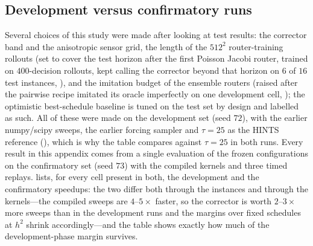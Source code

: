 \begin{table}[H]
\color{red}
\centering
\caption{Measured single-thread cost of one operation as a function of the grid size (Poisson; median of repeated calls). Multigrid uses a direct solve below $64^2$ and is not listed there.}
\resizebox{0.9\textwidth}{!}{\caoverheads}
\label{tab:ca_overheads}
\end{table}

\begin{table}[H]
\color{red}
\centering
\caption{Training-cost amortisation for the GS pairing: corrector training (data generation and least-squares fit, CPU), router training (oracle rollouts and DAgger rounds), median wall-clock saved per solve at $\varepsilon = h^2$ relative to HINTS ($\tau{=}15$) and to the solver alone, and the number of solves after which the router's training cost is recovered relative to HINTS.}
\resizebox{\textwidth}{!}{\caamort}
\label{tab:ca_amort}
\end{table}

\subsection{Development versus confirmatory runs} \label{sec:wallclock_heldout}

Several choices of this study were made after looking at test results: the corrector band and the anisotropic sensor grid, the length of the $512^2$ router-training rollouts (set to cover the test horizon after the first Poisson Jacobi router, trained on $400$-decision rollouts, kept calling the corrector beyond that horizon on $6$ of $16$ test instances, ), and the imitation budget of the ensemble routers (raised after the pairwise recipe imitated its oracle imperfectly on one development cell, ); the optimistic best-schedule baseline is tuned on the test set by design and labelled as such. All of these were made on the development set (seed $72$), with the earlier numpy/scipy sweeps, the earlier forcing sampler and $\tau = 25$ as the HINTS reference (), which is why the table compares against $\tau = 25$ in both runs. Every result in this appendix comes from a single evaluation of the frozen configurations on the confirmatory set (seed $73$) with the compiled kernels and three timed replays.  lists, for every cell present in both, the development and the confirmatory speedups: the two differ both through the instances and through the kernels---the compiled sweeps are $4$--$5\times$ faster, so the corrector is worth $2$--$3\times$ more sweeps than in the development runs and the margins over fixed schedules at $h^2$ shrink accordingly---and the table shows exactly how much of the development-phase margin survives.

